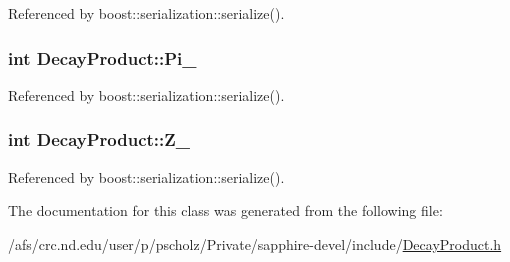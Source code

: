 Referenced by boost\-::serialization\-::serialize().

\hypertarget{classDecayProduct_a67f29a58426c136c7b7ac6e7afb1791e}{
\subsubsection[{Pi\-\_\-}]{\setlength{\rightskip}{0pt plus 5cm}int Decay\-Product\-::\-Pi\-\_\-}}\label{classDecayProduct_a67f29a58426c136c7b7ac6e7afb1791e}


Referenced by boost\-::serialization\-::serialize().

\hypertarget{classDecayProduct_a63c69c5515d18b7fa031623dbf70707f}{
\subsubsection[{Z\-\_\-}]{\setlength{\rightskip}{0pt plus 5cm}int Decay\-Product\-::\-Z\-\_\-}}\label{classDecayProduct_a63c69c5515d18b7fa031623dbf70707f}


Referenced by boost\-::serialization\-::serialize().



The documentation for this class was generated from the following file\-:\begin{DoxyCompactItemize}
\item 
/afs/crc.\-nd.\-edu/user/p/pscholz/\-Private/sapphire-\/devel/include/\hyperlink{DecayProduct_8h}{Decay\-Product.\-h}\end{DoxyCompactItemize}
